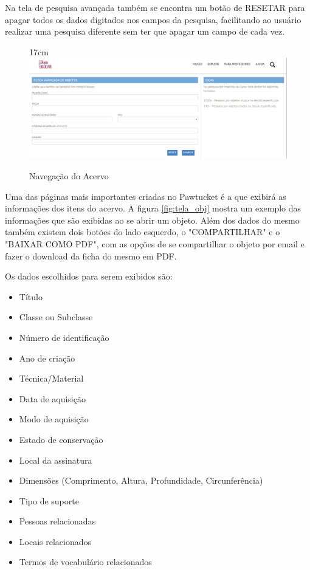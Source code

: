 \documentclass[a4paper,12pt,oneside,onecolumn,final,fleqn]{repUERJ}
\begin{document}
Na tela de pesquisa avançada também se encontra um botão de RESETAR para apagar todos os dados digitados nos campos da pesquisa, facilitando ao usuário realizar uma pesquisa diferente sem ter que apagar um campo de cada vez.

\begin{figure}[!ht]{17cm}
	\includegraphics[width=15cm, center]{figuras/pawtucket_buscaavancada.jpg}
	\caption{Navegação do Acervo} \label{fig:tela_pesqav}
\end{figure}

Uma das páginas mais importantes criadas no Pawtucket é a que exibirá as informações dos itens do acervo. A figura \ref{fig:tela_obj} mostra um exemplo das informações que são exibidas ao se abrir um objeto. Além dos dados do mesmo também existem dois botões do lado esquerdo, o "COMPARTILHAR" e o "BAIXAR COMO PDF", com as opções de se compartilhar o objeto por email e fazer o download da ficha do mesmo em PDF.

Os dados escolhidos para serem exibidos são:

\begin{itemize}
	\item Título
	\item Classe ou Subclasse
	\item Número de identificação
	\item Ano de criação
	\item Técnica/Material
	\item Data de aquisição
	\item Modo de aquisição
	\item Estado de conservação
	\item Local da assinatura
	\item Dimensões (Comprimento, Altura, Profundidade, Circunferência)
	\item Tipo de suporte
	\item Pessoas relacionadas
	\item Locais relacionados
	\item Termos de vocabulário relacionados
\end{itemize}
\end{document}
